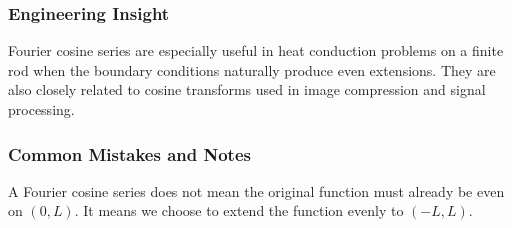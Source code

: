 \subsubsection*{Engineering Insight}

\begin{noteBox}
    Fourier cosine series are especially useful in heat conduction problems on a finite rod when the boundary conditions naturally produce even extensions. They are also closely related to cosine transforms used in image compression and signal processing.
\end{noteBox}

\subsubsection*{Common Mistakes and Notes}

\begin{conceptbox}
    A Fourier cosine series does not mean the original function must already be even on $(0,L)$. It means we choose to extend the function evenly to $(-L,L)$.
\end{conceptbox}